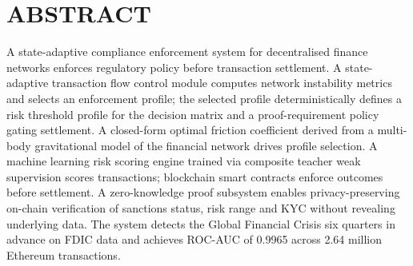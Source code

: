 \documentclass[12pt,a4paper]{article}
\begin{document}
\newpage
\section*{ABSTRACT}

A state-adaptive compliance enforcement system for decentralised finance
networks enforces regulatory policy before transaction settlement. A
state-adaptive transaction flow control module computes network instability
metrics and selects an enforcement profile; the selected profile
deterministically defines a risk threshold profile for the decision matrix
and a proof-requirement policy gating settlement. A closed-form optimal
friction coefficient derived from a multi-body gravitational model of the
financial network drives profile selection. A machine learning risk scoring
engine trained via composite teacher weak supervision scores transactions;
blockchain smart contracts enforce outcomes before settlement. A
zero-knowledge proof subsystem enables privacy-preserving on-chain
verification of sanctions status, risk range and KYC without revealing
underlying data. The system detects the Global Financial Crisis six
quarters in advance on FDIC data and achieves ROC-AUC of 0.9965 across
2.64 million Ethereum transactions.
\end{document}

